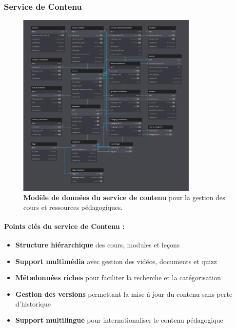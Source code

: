 \subsubsection{Service de Contenu}
\begin{figure}[p]
  \centering
  \includegraphics[width=0.8\textwidth,keepaspectratio]{week_1_img/services_db_screanshots/Screenshot 2025-06-06 at 15-07-51 Content_Service.pdf.png}
  \caption{\textbf{Modèle de données du service de contenu} pour la gestion des cours et ressources pédagogiques.}
  \label{fig:content_service}
\end{figure}

\vspace{5pt}
\small
\paragraph{Points clés du service de Contenu :}
\begin{itemize}[leftmargin=*,noitemsep,topsep=0pt]
  \item \textbf{Structure hiérarchique} des cours, modules et leçons
  \item \textbf{Support multimédia} avec gestion des vidéos, documents et quizz
  \item \textbf{Métadonnées riches} pour faciliter la recherche et la catégorisation
  \item \textbf{Gestion des versions} permettant la mise à jour du contenu sans perte d'historique
  \item \textbf{Support multilingue} pour internationaliser le contenu pédagogique
\end{itemize}
\normalsize
\clearpage

